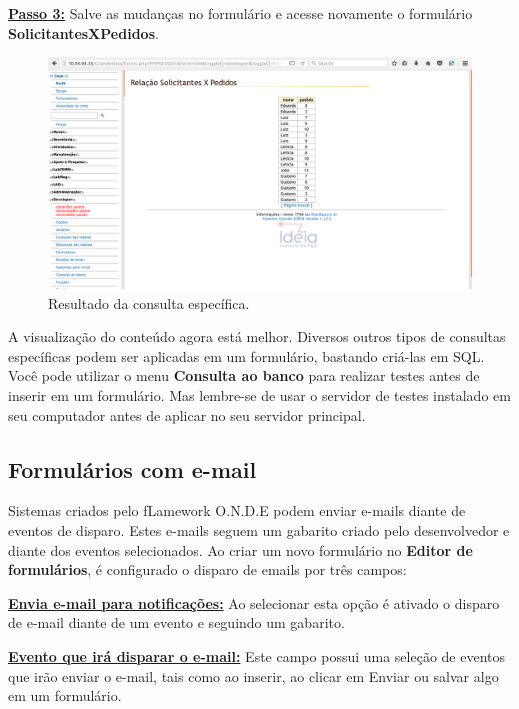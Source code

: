 \documentclass[9pt]{report}
\begin{document}
{      \underline{\textbf{Passo 3:}} Salve as mudanças no formulário
      e acesse novamente o formulário \textbf{SolicitantesXPedidos}.

      \begin{figure}[H]
        \includegraphics[width=\textwidth]{2_Formularios/5_Consulta_especifica/54.png}
        \caption{Resultado da consulta específica.}
        \label{fig:consultaespresult}
      \end{figure}

      A visualização do conteúdo agora está melhor. Diversos outros
      tipos de consultas específicas podem ser aplicadas em um
      formulário, bastando criá-las em SQL. Você pode utilizar o menu
      \textbf{Consulta ao banco} para realizar testes antes de
      inserir em um formulário. Mas lembre-se de usar o servidor de
      testes instalado em seu computador antes de aplicar no seu
      servidor principal.
        
      \subsection{Formulários com e-mail} 

      Sistemas criados pelo fLamework O.N.D.E podem enviar e-mails
      diante de eventos de disparo. Estes e-mails seguem um gabarito
      criado pelo desenvolvedor e diante dos eventos selecionados.
      Ao criar um novo formulário no \textbf{Editor de formulários},
      é configurado o disparo de emails por três campos:

      \underline{\textbf{Envia e-mail para notificações:}} Ao
      selecionar esta opção é ativado o disparo de e-mail diante de
      um evento e seguindo um gabarito.
      
      \underline{\textbf{Evento que irá disparar o e-mail:}} Este
      campo possui uma seleção de eventos que irão enviar o e-mail,
      tais como ao inserir, ao clicar em Enviar ou salvar algo em um
      formulário.
      
}
\end{document}
